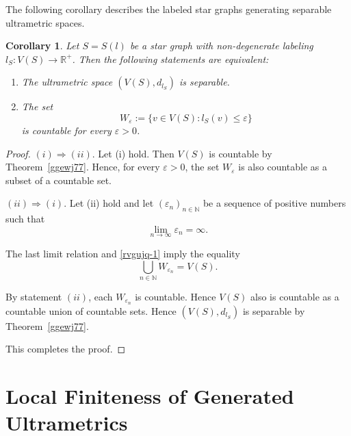 \documentclass[pdflatex,sn-mathphys-num]{sn-jnl}%
\newtheorem{corollary}{Corollary}%
\theoremstyle{thmstyletwo}%
\begin{document}
The following corollary describes the labeled star graphs generating separable ultrametric spaces.


\begin{corollary}\label{dfuj247-1}
Let $S = S(l)$ be a star graph with non-degenerate labeling $l_S \colon V(S) \to \mathbb{R}^{+}$. Then the following statements are equivalent:
\begin{enumerate}[label=\textit{(\roman*)}, left=0pt] 
\item The ultrametric space $(V(S), d_{l_S})$ is separable.

\item The set 
\begin{equation}\label{rvgujq-1}
W_\varepsilon := \{v \in V(S) \colon l_S(v) \leq \varepsilon\}
\end{equation}
is countable for every $\varepsilon > 0$.
\end{enumerate}
\end{corollary}

\begin{proof}

$(i) \Rightarrow (ii)$. Let (i) hold. Then $V(S)$ is countable by Theorem~\ref{ggewj77}. Hence, for every $\varepsilon > 0$, the set $W_\varepsilon$ is also countable as a subset of a countable set.

$(ii) \Rightarrow (i)$. Let (ii) hold and let $(\varepsilon_n)_{n \in \mathbb{N}}$ be a sequence of positive numbers such that
\begin{equation*}
\lim_{n \to \infty} \varepsilon_n = \infty.
\end{equation*}

The last limit relation and \eqref{rvgujq-1} imply the equality
\begin{equation}
\bigcup_{n \in \mathbb{N}} W_{\varepsilon_n} = V(S).
\end{equation}

By statement $(ii)$, each $W_{\varepsilon_n}$ is countable. Hence $V(S)$ also is countable as a countable union of countable sets. Hence $(V(S), d_{l_S})$ is separable by Theorem~\ref{ggewj77}.

This completes the proof.
\end{proof}












\section{Local Finiteness of Generated Ultrametrics}\label{sec4}
\end{document}
